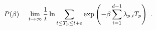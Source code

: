 \begin{equation}
P(\beta) = \lim_{t\rightarrow\infty} {1\over t} \ln 
\sum_{t\leq T_p\leq t+\varepsilon} \exp\left( -\beta \sum_{i=1}^{d-1}
\lambda_{p,i}T_p\right)\ .
\label{eq27}
\end{equation}


